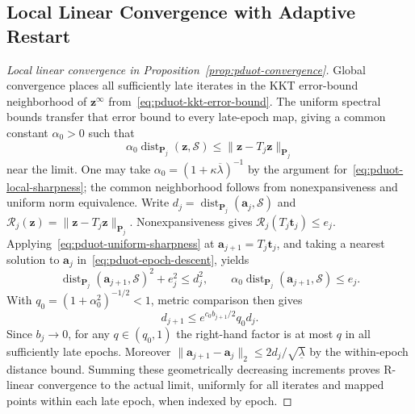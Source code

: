 \subsection{Local Linear Convergence with Adaptive Restart}
\label{app:pduot-restart}

\begin{proof}[Local linear convergence in Proposition~\ref{prop:pduot-convergence}]
Global convergence places all sufficiently late iterates in the KKT error-bound neighborhood of $\mathbf z^\infty$ from~\eqref{eq:pduot-kkt-error-bound}.
The uniform spectral bounds transfer that error bound to every late-epoch map, giving a common constant $\alpha_0>0$ such that
\begin{equation}
\label{eq:pduot-uniform-sharpness}
\alpha_0\operatorname{dist}_{\mathbf P_j}(\mathbf z,\mathcal S)\leq\|\mathbf z-T_j\mathbf z\|_{\mathbf P_j}
\end{equation}
near the limit.
One may take $\alpha_0=(1+\kappa\overline\lambda)^{-1}$ by the argument for~\eqref{eq:pduot-local-sharpness}; the common neighborhood follows from nonexpansiveness and uniform norm equivalence.
Write $d_j=\operatorname{dist}_{\mathbf P_j}(\mathbf a_j,\mathcal S)$ and $\mathcal R_j(\mathbf z)=\|\mathbf z-T_j\mathbf z\|_{\mathbf P_j}$.
Nonexpansiveness gives $\mathcal R_j(T_j\mathbf t_j)\leq e_j$.
Applying~\eqref{eq:pduot-uniform-sharpness} at $\mathbf a_{j+1}=T_j\mathbf t_j$, and taking a nearest solution to $\mathbf a_j$ in~\eqref{eq:pduot-epoch-descent}, yields
\begin{equation*}
\operatorname{dist}_{\mathbf P_j}(\mathbf a_{j+1},\mathcal S)^2+e_j^2\leq d_j^2,\qquad \alpha_0\operatorname{dist}_{\mathbf P_j}(\mathbf a_{j+1},\mathcal S)\leq e_j.
\end{equation*}
With $q_0=(1+\alpha_0^2)^{-1/2}<1$, metric comparison then gives
\begin{equation*}
d_{j+1}\leq e^{c_0b_{j+1}/2}q_0d_j.
\end{equation*}
Since $b_j\to0$, for any $q\in(q_0,1)$ the right-hand factor is at most $q$ in all sufficiently late epochs.
Moreover $\|\mathbf a_{j+1}-\mathbf a_j\|_2\leq2d_j/\sqrt{\underline\lambda}$ by the within-epoch distance bound.
Summing these geometrically decreasing increments proves R-linear convergence to the actual limit, uniformly for all iterates and mapped points within each late epoch, when indexed by epoch.


\end{proof}
